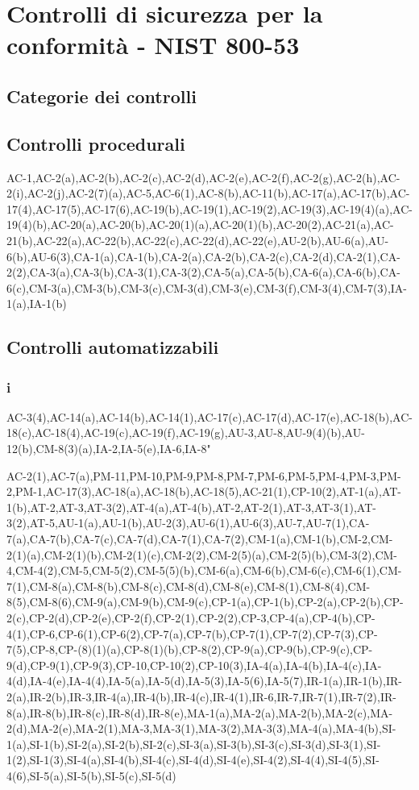 \documentclass[../main.tex]{subfiles}
\begin{document}
\section{Controlli di sicurezza per la conformità - NIST 800-53}
\subsection{Categorie dei controlli}
\subsection{Controlli procedurali}
AC-1,AC-2(a),AC-2(b),AC-2(c),AC-2(d),AC-2(e),AC-2(f),AC-2(g),AC-2(h),AC-2(i),AC-2(j),AC-2(7)(a),AC-5,AC-6(1),AC-8(b),AC-11(b),AC-17(a),AC-17(b),AC-17(4),AC-17(5),AC-17(6),AC-19(b),AC-19(1),AC-19(2),AC-19(3),AC-19(4)(a),AC-19(4)(b),AC-20(a),AC-20(b),AC-20(1)(a),AC-20(1)(b),AC-20(2),AC-21(a),AC-21(b),AC-22(a),AC-22(b),AC-22(c),AC-22(d),AC-22(e),AU-2(b),AU-6(a),AU-6(b),AU-6(3),CA-1(a),CA-1(b),CA-2(a),CA-2(b),CA-2(c),CA-2(d),CA-2(1),CA-2(2),CA-3(a),CA-3(b),CA-3(1),CA-3(2),CA-5(a),CA-5(b),CA-6(a),CA-6(b),CA-6(c),CM-3(a),CM-3(b),CM-3(c),CM-3(d),CM-3(e),CM-3(f),CM-3(4),CM-7(3),IA-1(a),IA-1(b)
\subsection{Controlli automatizzabili}
\subsubsection{i}

AC-3(4),AC-14(a),AC-14(b),AC-14(1),AC-17(c),AC-17(d),AC-17(e),AC-18(b),AC-18(c),AC-18(4),AC-19(c),AC-19(f),AC-19(g),AU-3,AU-8,AU-9(4)(b),AU-12(b),CM-8(3)(a),IA-2,IA-5(e),IA-6,IA-8" 

AC-2(1),AC-7(a),PM-11,PM-10,PM-9,PM-8,PM-7,PM-6,PM-5,PM-4,PM-3,PM-2,PM-1,AC-17(3),AC-18(a),AC-18(b),AC-18(5),AC-21(1),CP-10(2),AT-1(a),AT-1(b),AT-2,AT-3,AT-3(2),AT-4(a),AT-4(b),AT-2,AT-2(1),AT-3,AT-3(1),AT-3(2),AT-5,AU-1(a),AU-1(b),AU-2(3),AU-6(1),AU-6(3),AU-7,AU-7(1),CA-7(a),CA-7(b),CA-7(c),CA-7(d),CA-7(1),CA-7(2),CM-1(a),CM-1(b),CM-2,CM-2(1)(a),CM-2(1)(b),CM-2(1)(c),CM-2(2),CM-2(5)(a),CM-2(5)(b),CM-3(2),CM-4,CM-4(2),CM-5,CM-5(2),CM-5(5)(b),CM-6(a),CM-6(b),CM-6(c),CM-6(1),CM-7(1),CM-8(a),CM-8(b),CM-8(c),CM-8(d),CM-8(e),CM-8(1),CM-8(4),CM-8(5),CM-8(6),CM-9(a),CM-9(b),CM-9(c),CP-1(a),CP-1(b),CP-2(a),CP-2(b),CP-2(c),CP-2(d),CP-2(e),CP-2(f),CP-2(1),CP-2(2),CP-3,CP-4(a),CP-4(b),CP-4(1),CP-6,CP-6(1),CP-6(2),CP-7(a),CP-7(b),CP-7(1),CP-7(2),CP-7(3),CP-7(5),CP-8,CP-(8)(1)(a),CP-8(1)(b),CP-8(2),CP-9(a),CP-9(b),CP-9(c),CP-9(d),CP-9(1),CP-9(3),CP-10,CP-10(2),CP-10(3),IA-4(a),IA-4(b),IA-4(c),IA-4(d),IA-4(e),IA-4(4),IA-5(a),IA-5(d),IA-5(3),IA-5(6),IA-5(7),IR-1(a),IR-1(b),IR-2(a),IR-2(b),IR-3,IR-4(a),IR-4(b),IR-4(c),IR-4(1),IR-6,IR-7,IR-7(1),IR-7(2),IR-8(a),IR-8(b),IR-8(c),IR-8(d),IR-8(e),MA-1(a),MA-2(a),MA-2(b),MA-2(c),MA-2(d),MA-2(e),MA-2(1),MA-3,MA-3(1),MA-3(2),MA-3(3),MA-4(a),MA-4(b),SI-1(a),SI-1(b),SI-2(a),SI-2(b),SI-2(c),SI-3(a),SI-3(b),SI-3(c),SI-3(d),SI-3(1),SI-1(2),SI-1(3),SI-4(a),SI-4(b),SI-4(c),SI-4(d),SI-4(e),SI-4(2),SI-4(4),SI-4(5),SI-4(6),SI-5(a),SI-5(b),SI-5(c),SI-5(d)
\end{document}
